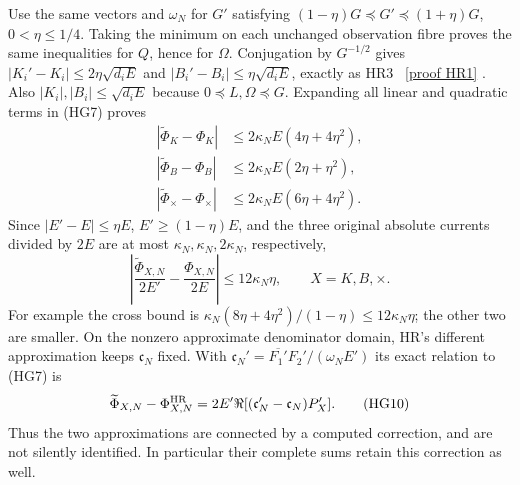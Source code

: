 \documentclass[11pt]{article}
\begin{document}
Use the same vectors and $\omega_N$ for $G'$ satisfying
$(1-\eta)G\preceq G'\preceq(1+\eta)G$, $0<\eta\le1/4$.
Taking the minimum on each unchanged observation fibre proves the
same inequalities for $Q$, hence for $\Omega$. Conjugation by
$G^{-1/2}$ gives
$|K_i'-K_i|\le2\eta\sqrt{d_iE}$ and
$|B_i'-B_i|\le\eta\sqrt{d_iE}$, exactly as HR3 \cite{HR}%
~\href{https://github.com/KokunoYumeto/zeta-function-research-reader/blob/5992ad50c0f2a06921f1fcaded7b4e38097c0739/workbenches/splitzero-tandem/continuations/20260920-original-kernel-mixed-determinants/providers/HEAT_OBSERVATION_RESPONSE_ERRORS.tex\#L22}{[proof HR1]}%
{}.
Also $|K_i|,|B_i|\le\sqrt{d_iE}$ because $0\preceq L,\Omega\preceq G$.
Expanding all linear and quadratic terms in (HG7) proves
\[
 \begin{aligned}
 |\widetilde\Phi_K-\Phi_K|&\le2\kappa_NE(4\eta+4\eta^2),\\
 |\widetilde\Phi_B-\Phi_B|&\le2\kappa_NE(2\eta+\eta^2),\\
 |\widetilde\Phi_\times-\Phi_\times|&\le2\kappa_NE(6\eta+4\eta^2).
 \end{aligned}\tag{HG8}
\]
Since $|E'-E|\le\eta E$, $E'\ge(1-\eta)E$, and the three
original absolute currents divided by $2E$ are at most
$\kappa_N,\kappa_N,2\kappa_N$, respectively,
\[
 \left|\frac{\widetilde\Phi_{X,N}}{2E'}-
              \frac{\Phi_{X,N}}{2E}\right|\le12\kappa_N\eta,
 \qquad X=K,B,\times.\tag{HG9}
\]
For example the cross bound is
$\kappa_N(8\eta+4\eta^2)/(1-\eta)\le12\kappa_N\eta$;
the other two are smaller. On the nonzero approximate denominator
domain, HR's different approximation keeps $\mathfrak c_N$ fixed.
With $\mathfrak c_N'=\overline{F_1'}F_2'/(\omega_NE')$ its exact
relation to (HG7) is
\[
 \widetilde\Phi_{X,N}-\Phi^{\rm HR}_{X,N}
       =2E'\Re[(\mathfrak c_N'-\mathfrak c_N)P_X'] .\tag{HG10}
\]
Thus the two approximations are connected by a computed correction,
and are not silently identified. In particular their complete sums
retain this correction as well.
\end{document}
